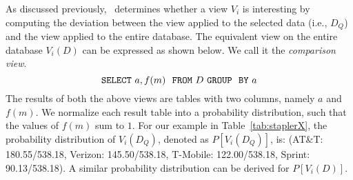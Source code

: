 As discussed previously, \VizRecDB\ determines
whether a view $V_i$ is interesting
by computing the deviation between the view applied to the selected data (i.e., $D_Q$) 
and the view applied to the entire database.
The equivalent view on the entire database $V_i (D)$ can be expressed as shown
below. We call it the {\em comparison view}. 
$${\tt SELECT \ } a, f(m) \ \ {\tt FROM} \  D\  {\tt GROUP \ \ BY} \ a$$
The results of both the above views are tables with two columns, namely $a$ and
$f(m)$. We normalize each result table into a probability distribution, such
that the values of $f(m)$ sum to $1$.
For our example in Table~\ref{tab:staplerX}, the probability distribution of
$V_i(D_Q)$, denoted as $P[V_i (D_Q)]$, is: (AT\&T: 180.55/538.18, Verizon:
145.50/538.18, T-Mobile: 122.00/538.18,  Sprint: 90.13/538.18). 
A similar
probability distribution can be derived for $P[V_i (D)]$.

